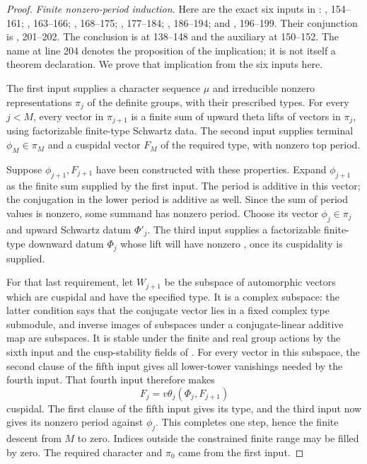 \begin{proof}
\textit{Finite nonzero-period induction.}
Here are the exact six inputs in :
, 154--161;
, 163--166;
, 168--175;
, 177--184;
, 186--194; and
, 196--199.
Their conjunction is , 201--202.
The conclusion  is at 138--148 and the auxiliary
 at 150--152.
The name  at line 204 denotes the proposition of
the implication; it is not itself a theorem declaration.
We prove that implication from the six inputs here.

The first input supplies a character sequence $\mu$ and irreducible nonzero
representations $\pi_j$ of the definite groups, with their prescribed types.
For every $j<M$, every vector in $\pi_{j+1}$ is a finite sum of upward theta
lifts of vectors in $\pi_j$, using factorizable finite-type Schwartz data.
The second input supplies terminal $\phi_M\in\pi_M$ and a cuspidal vector
$F_M$ of the required type, with nonzero top period.

Suppose $\phi_{j+1},F_{j+1}$ have been constructed with these properties.
Expand $\phi_{j+1}$ as the finite sum supplied by the first input.
The period is additive in this vector; the conjugation in the lower
period is additive as well. Since the sum of period values is nonzero,
some summand has nonzero period. Choose its vector $\phi_j\in\pi_j$ and
upward Schwartz datum $\Phi'_j$.
The third input supplies a factorizable finite-type downward datum $\Phi_j$
whose lift will have nonzero , once its cuspidality is supplied.

For that last requirement, let $W_{j+1}$ be the subspace of automorphic
vectors which are cuspidal and have the specified  type.
It is a complex subspace: the latter condition says that the conjugate
vector lies in a fixed complex type submodule, and inverse images of
subspaces under a conjugate-linear additive map are subspaces.
It is stable under the finite and real group actions by the sixth input
and the cusp-stability fields of .
For every vector in this subspace, the second clause of the fifth input
gives all lower-tower vanishings needed by the fourth input.
That fourth input therefore makes
\[
 F_j=v\theta_j(\Phi_j,F_{j+1})
\]
cuspidal. The first clause of the fifth input gives its  type,
and the third input now gives its nonzero period against $\phi_j$.
This completes one step, hence the finite descent from $M$ to zero.
Indices outside the constrained finite range may be filled by zero.
The required character and $\pi_0$ came from the first input.


\end{proof}
